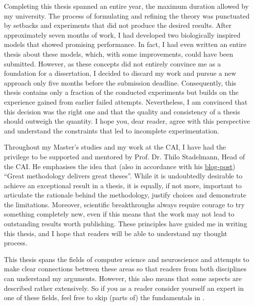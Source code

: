 Completing this thesis spanned an entire year, the maximum duration allowed by my university.
The process of formulating and refining the theory was punctuated by setbacks and experiments that did not produce the desired results.
After approximately seven months of work, I had developed two biologically inspired models that showed promising performance. 
In fact, I had even written an entire thesis about these models, which, with some improvements, could have been submitted.
However, as these concepts did not entirely convince me as a foundation for a dissertation, I decided to discard my work and pursue a new approach only five months before the submission deadline.
Consequently, this thesis contains only a fraction of the conducted experiments but builds on the experience gained from earlier failed attempts.
Nevertheless, I am convinced that this decision was the right one and that the quality and consistency of a thesis should outweigh the quantity.
I hope you, dear reader, agree with this perspective and understand the constraints that led to incomplete experimentation.

Throughout my Master's studies and my work at the CAI, I  have had the privilege to be supported and mentored by Prof. Dr. Thilo Stadelmann, Head of the CAI.
He emphasises the idea that (also in accordance with his \href{https://stdm.github.io/Great-methodology-delivers-great-theses/}{blog-post}) ``Great methodology delivers great theses''.
While it is undoubtedly desirable to achieve an exceptional result in a thesis, it is equally, if not more, important to articulate the rationale behind the methodology, justify choices and demonstrate the limitations. 
Moreover, scientific breakthroughs always require courage to try something completely new, even if this means that the work may not lead to outstanding results worth publishing.
These principles have guided me in writing this thesis, and I hope that readers will be able to understand my thought process.

This thesis spans the fields of computer science and neuroscience and attempts to make clear connections between these areas so that readers from both disciplines can understand my arguments. 
However, this also means that some aspects are described rather extensively.
So if you as a reader consider yourself an expert in one of these fields, feel free to skip (parts of) the fundamentals in .

